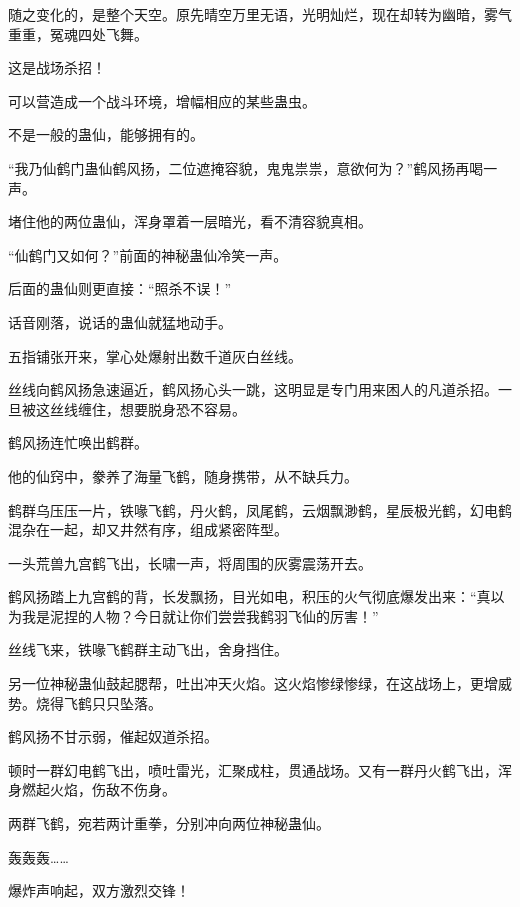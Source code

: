 \begin{this_body}
随之变化的，是整个天空。原先晴空万里无语，光明灿烂，现在却转为幽暗，雾气重重，冤魂四处飞舞。

这是战场杀招！

可以营造成一个战斗环境，增幅相应的某些蛊虫。

不是一般的蛊仙，能够拥有的。

“我乃仙鹤门蛊仙鹤风扬，二位遮掩容貌，鬼鬼祟祟，意欲何为？”鹤风扬再喝一声。

堵住他的两位蛊仙，浑身罩着一层暗光，看不清容貌真相。

“仙鹤门又如何？”前面的神秘蛊仙冷笑一声。

后面的蛊仙则更直接：“照杀不误！”

话音刚落，说话的蛊仙就猛地动手。

五指铺张开来，掌心处爆射出数千道灰白丝线。

丝线向鹤风扬急速逼近，鹤风扬心头一跳，这明显是专门用来困人的凡道杀招。一旦被这丝线缠住，想要脱身恐不容易。

鹤风扬连忙唤出鹤群。

他的仙窍中，豢养了海量飞鹤，随身携带，从不缺兵力。

鹤群乌压压一片，铁喙飞鹤，丹火鹤，凤尾鹤，云烟飘渺鹤，星辰极光鹤，幻电鹤混杂在一起，却又井然有序，组成紧密阵型。

一头荒兽九宫鹤飞出，长啸一声，将周围的灰雾震荡开去。

鹤风扬踏上九宫鹤的背，长发飘扬，目光如电，积压的火气彻底爆发出来：“真以为我是泥捏的人物？今日就让你们尝尝我鹤羽飞仙的厉害！”

丝线飞来，铁喙飞鹤群主动飞出，舍身挡住。

另一位神秘蛊仙鼓起腮帮，吐出冲天火焰。这火焰惨绿惨绿，在这战场上，更增威势。烧得飞鹤只只坠落。

鹤风扬不甘示弱，催起奴道杀招。

顿时一群幻电鹤飞出，喷吐雷光，汇聚成柱，贯通战场。又有一群丹火鹤飞出，浑身燃起火焰，伤敌不伤身。

两群飞鹤，宛若两计重拳，分别冲向两位神秘蛊仙。

轰轰轰……

爆炸声响起，双方激烈交锋！

\end{this_body}

